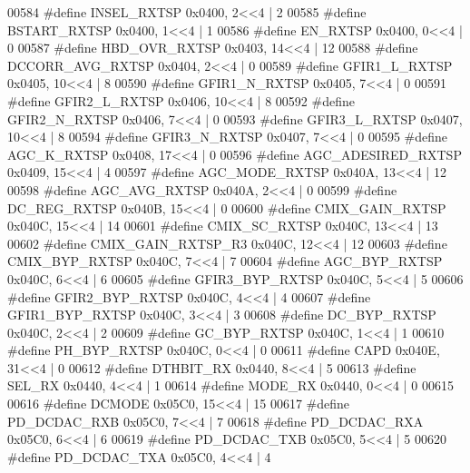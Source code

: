 \begin{DoxyCode}
00584 \textcolor{preprocessor}{#define INSEL\_RXTSP 0x0400, 2<<4 |  2}
00585 \textcolor{preprocessor}{#define BSTART\_RXTSP 0x0400, 1<<4 |  1}
00586 \textcolor{preprocessor}{#define EN\_RXTSP 0x0400, 0<<4 |  0}
00587 \textcolor{preprocessor}{#define HBD\_OVR\_RXTSP 0x0403, 14<<4 |  12}
00588 \textcolor{preprocessor}{#define DCCORR\_AVG\_RXTSP 0x0404, 2<<4 |  0}
00589 \textcolor{preprocessor}{#define GFIR1\_L\_RXTSP 0x0405, 10<<4 |  8}
00590 \textcolor{preprocessor}{#define GFIR1\_N\_RXTSP 0x0405, 7<<4 |  0}
00591 \textcolor{preprocessor}{#define GFIR2\_L\_RXTSP 0x0406, 10<<4 |  8}
00592 \textcolor{preprocessor}{#define GFIR2\_N\_RXTSP 0x0406, 7<<4 |  0}
00593 \textcolor{preprocessor}{#define GFIR3\_L\_RXTSP 0x0407, 10<<4 |  8}
00594 \textcolor{preprocessor}{#define GFIR3\_N\_RXTSP 0x0407, 7<<4 |  0}
00595 \textcolor{preprocessor}{#define AGC\_K\_RXTSP 0x0408, 17<<4 |  0}
00596 \textcolor{preprocessor}{#define AGC\_ADESIRED\_RXTSP 0x0409, 15<<4 |  4}
00597 \textcolor{preprocessor}{#define AGC\_MODE\_RXTSP 0x040A, 13<<4 |  12}
00598 \textcolor{preprocessor}{#define AGC\_AVG\_RXTSP 0x040A, 2<<4 |  0}
00599 \textcolor{preprocessor}{#define DC\_REG\_RXTSP 0x040B, 15<<4 |  0}
00600 \textcolor{preprocessor}{#define CMIX\_GAIN\_RXTSP 0x040C, 15<<4 |  14}
00601 \textcolor{preprocessor}{#define CMIX\_SC\_RXTSP 0x040C, 13<<4 |  13}
00602 \textcolor{preprocessor}{#define CMIX\_GAIN\_RXTSP\_R3 0x040C, 12<<4 | 12}
00603 \textcolor{preprocessor}{#define CMIX\_BYP\_RXTSP 0x040C, 7<<4 |  7}
00604 \textcolor{preprocessor}{#define AGC\_BYP\_RXTSP 0x040C, 6<<4 |  6}
00605 \textcolor{preprocessor}{#define GFIR3\_BYP\_RXTSP 0x040C, 5<<4 |  5}
00606 \textcolor{preprocessor}{#define GFIR2\_BYP\_RXTSP 0x040C, 4<<4 |  4}
00607 \textcolor{preprocessor}{#define GFIR1\_BYP\_RXTSP 0x040C, 3<<4 |  3}
00608 \textcolor{preprocessor}{#define DC\_BYP\_RXTSP 0x040C, 2<<4 |  2}
00609 \textcolor{preprocessor}{#define GC\_BYP\_RXTSP 0x040C, 1<<4 |  1}
00610 \textcolor{preprocessor}{#define PH\_BYP\_RXTSP 0x040C, 0<<4 |  0}
00611 \textcolor{preprocessor}{#define CAPD 0x040E, 31<<4 |  0}
00612 \textcolor{preprocessor}{#define DTHBIT\_RX 0x0440, 8<<4 |  5}
00613 \textcolor{preprocessor}{#define SEL\_RX 0x0440, 4<<4 |  1}
00614 \textcolor{preprocessor}{#define MODE\_RX 0x0440, 0<<4 |  0}
00615 
00616 \textcolor{preprocessor}{#define DCMODE 0x05C0, 15<<4 | 15}
00617 \textcolor{preprocessor}{#define PD\_DCDAC\_RXB 0x05C0, 7<<4 | 7}
00618 \textcolor{preprocessor}{#define PD\_DCDAC\_RXA 0x05C0, 6<<4 | 6}
00619 \textcolor{preprocessor}{#define PD\_DCDAC\_TXB 0x05C0, 5<<4 | 5}
00620 \textcolor{preprocessor}{#define PD\_DCDAC\_TXA 0x05C0, 4<<4 | 4}

\end{DoxyCode}
